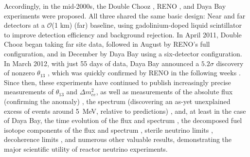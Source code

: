 \documentclass[../thesis.tex]{subfiles}
\begin{document}
Accordingly, in the mid-2000s, the Double Chooz \cite{Ardellier:2006mn}, RENO \cite{Ahn:2010vy}, and Daya Bay \cite{Guo:2007ug} experiments were proposed. All three shared the same basic design: Near and far detectors at a $\mathcal{O}$(1 km) (far) baseline, using gadolinium-doped liquid scintillator to improve detection efficiency and background rejection. In April 2011, Double Chooz began taking far site data, followed in August by RENO's full configuration, and in December by Daya Bay using a six-detector configuration. In March 2012, with just 55 days of data, Daya Bay announced a $5.2\sigma$ discovery of nonzero $\theta_{13}$ \cite{PhysRevLett.108.171803}, which was quickly confirmed by RENO in the following weeks \cite{PhysRevLett.108.191802}. Since then, these experiments have continued to publish increasingly precise measurements of $\theta_{13}$ and $\Delta m^2_{ee}$, as well as measurements of the absolute flux (confirming the anomaly) \cite{PhysRevD.100.052004,Atif:2020eyo,DoubleChooz2020}, the spectrum (discovering an as-yet unexplained excess of events around 5~MeV, relative to predictions) \cite{PhysRevD.100.052004,Atif:2020eyo,DoubleChooz2020}, and, at least in the case of Daya Bay, the time evolution of the flux and spectrum \cite{PhysRevLett.118.251801}, the decomposed fuel isotope components of the flux and spectrum \cite{PhysRevLett.123.111801}, sterile neutrino limits \cite{PhysRevLett.117.151801}, decoherence limits \cite{DayaBayWavePacket}, and numerous other valuable results, demonstrating the major scientific utility of reactor neutrino experiments.
\end{document}
